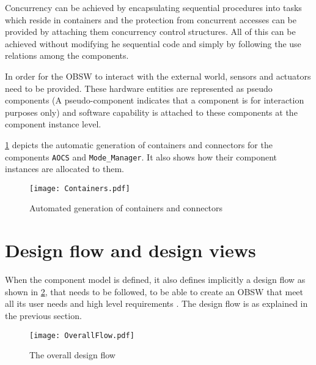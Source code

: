 \begin{description}
Concurrency can be achieved by encapsulating sequential procedures into tasks which reside in containers and the protection from concurrent accesses can be provided by attaching them concurrency control structures. All of this can be achieved without modifying he sequential code and simply by following the use relations among the components.

In order for the OBSW to interact with the external world, sensors and actuators need to be provided. These hardware entities are represented as pseudo components (A pseudo-component indicates that a component is for interaction purposes only) and software capability is attached to these components at the component instance level.    
\end{description}

\cref{fig: Containers} depicts the automatic generation of containers and connectors for the components \texttt{AOCS} and \texttt{Mode\_Manager}. It also shows how their component instances are allocated to them. 

\begin{figure}[h]
	\centering
	\texttt{[image: Containers.pdf]}
	\caption{Automated generation of containers and connectors}
	\label{fig: Containers}
\end{figure}

\section{Design flow and design views}
\label{section: Design flow and views}
When the component model is defined, it also defines implicitly a design flow as shown in \cref{fig: Design flow}, that needs to be followed, to be able to create an OBSW that meet all its user needs and high level requirements \cite{SAVOIR}\cite{PhdThesis}\cite{CompBasedProcess}. The design flow is as explained in the previous section. 

\begin{figure}[h]
	\centering
	\texttt{[image: OverallFlow.pdf]}
	\caption{The overall design flow}
	\label{fig: Design flow}
\end{figure}

